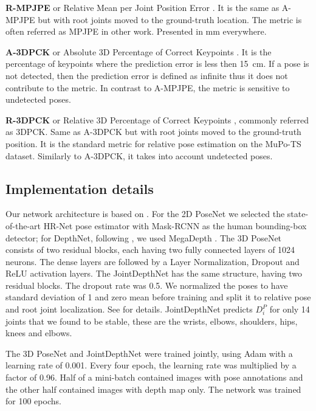 \documentclass[runningheads]{llncs}
\begin{document}
\textbf{R-MPJPE} or Relative Mean per Joint Position Error \cite{h36m,veges2019depthpose}. It is the same as A-MPJPE but with root joints moved to the ground-truth location. The metric is often referred as MPJPE in other work. Presented in mm everywhere.

\textbf{A-3DPCK} or Absolute 3D Percentage of Correct Keypoints \cite{moon2019camdistance}. It is the percentage of keypoints where the prediction error is less then 15~cm. If a pose is not detected, then the prediction error is defined as infinite thus it does not contribute to the metric. In contrast to A-MPJPE, the metric is sensitive to undetected poses.

\textbf{R-3DPCK} or Relative 3D Percentage of Correct Keypoints \cite{mehta2018single_shot,moon2019camdistance}, commonly referred as 3DPCK. Same as A\nobreakdash-3DPCK but with root joints moved to the ground-truth position. It is the standard metric for relative pose estimation on the MuPo-TS dataset. Similarly to A\nobreakdash-3DPCK, it takes into account undetected poses.

\subsection{Implementation details}
Our network architecture is based on \cite{veges2019depthpose}. For the 2D PoseNet we selected the state-of-the-art HR-Net pose estimator \cite{hrnet} with Mask-RCNN \cite{maskrcnn} as the human bounding-box detector; for DepthNet, following \cite{veges2019depthpose}, we used MegaDepth \cite{megadepth2018}. The 3D PoseNet consists of two residual blocks, each having two fully connected layers of 1024 neurons. The dense layers are followed by a Layer Normalization, Dropout and ReLU activation layers. The JointDepthNet has the same structure, having two residual blocks. The dropout rate was 0.5. We normalized the poses to have standard deviation of 1 and zero mean before training and split it to relative pose and root joint localization. See \cite{veges2019depthpose} for details. JointDepthNet predicts $D^P_i$ for only 14 joints  that we found to be stable, these are the wrists, elbows, shoulders, hips, knees and elbows.

The 3D PoseNet and JointDepthNet were trained jointly, using Adam with a learning rate of 0.001. Every four epoch, the learning rate was multiplied by a factor of 0.96. Half of a mini-batch contained images with pose annotations and the other half contained images with depth map only.
The network was trained for 100 epochs.
\end{document}
